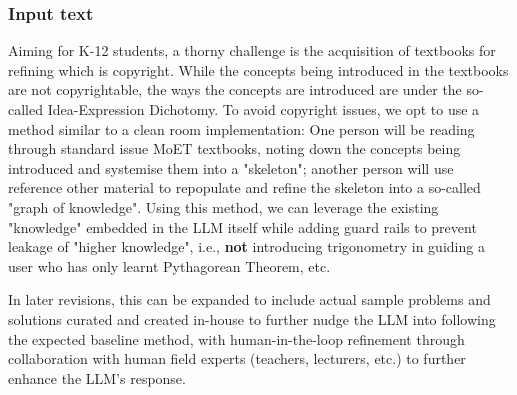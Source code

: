 \subsubsection{Input text}
Aiming for K-12 students, a thorny challenge is the acquisition of textbooks for refining
 which is copyright. While the concepts being introduced in the textbooks are not copyrightable, the ways the concepts
 are introduced are under the so-called Idea-Expression Dichotomy. To avoid copyright issues, we opt to use a method
 similar to a clean room implementation: One person will be reading through standard issue MoET textbooks, noting down
 the concepts being introduced and systemise them into a "skeleton"; another person will use reference other material
 to repopulate and refine the skeleton into a so-called "graph of knowledge". Using this method, we can leverage the
 existing "knowledge" embedded in the LLM itself while adding guard rails to prevent leakage of "higher knowledge",
 i.e., \textbf{not} introducing trigonometry in guiding a user who has only learnt Pythagorean Theorem, etc. 

 In later revisions, this can be expanded to include actual sample problems and solutions curated and created in-house
 to further nudge the LLM into following the expected baseline method, with human-in-the-loop refinement through
 collaboration with human field experts (teachers, lecturers, etc.) to further enhance the LLM's response.
